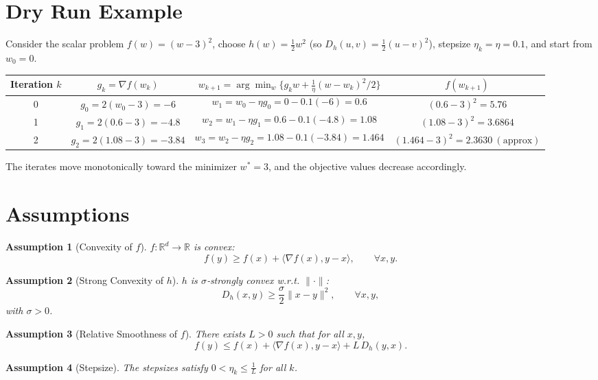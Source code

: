 \documentclass{article}
\newtheorem{assumption}{Assumption}
\newcommand{\inner}[2]{\langle #1,#2\rangle}
\newcommand{\grad}{\nabla}
\newcommand{\Breg}[2]{D_{h}(#1,#2)}
\begin{document}
\section*{Dry Run Example}
Consider the scalar problem $f(w)=(w-3)^{2}$, choose $h(w)=\tfrac12 w^{2}$ (so $\Breg{u}{v}=\tfrac12 (u-v)^{2}$), stepsize $\eta_k=\eta=0.1$, and start from $w_{0}=0$.

\begin{center}
\begin{tabular}{c|c|c|c}
Iteration $k$ & $g_k=\grad f(w_k)$ & $w_{k+1}= \arg\min_w\{g_k w+\frac{1}{\eta}(w-w_k)^2/2\}$ & $f(w_{k+1})$\\ \hline
0 & $g_0=2(w_0-3)=-6$ &
\[
w_{1}=w_0-\eta g_0=0-0.1(-6)=0.6
\] &
$(0.6-3)^{2}=5.76$\\ \hline
1 & $g_1=2(0.6-3)=-4.8$ &
\[
w_{2}=w_{1}-\eta g_1=0.6-0.1(-4.8)=1.08
\] &
$(1.08-3)^{2}=3.6864$\\ \hline
2 & $g_2=2(1.08-3)=-3.84$ &
\[
w_{3}=w_{2}-\eta g_2=1.08-0.1(-3.84)=1.464
\] &
$(1.464-3)^{2}=2.3630\ (\text{approx})$
\end{tabular}
\end{center}
The iterates move monotonically toward the minimizer $w^{*}=3$, and the objective values decrease accordingly.

\newpage
\section*{Assumptions}
\begin{assumption}[Convexity of $f$]
\label{ass:convex}
$f:\mathbb{R}^{d}\rightarrow\mathbb{R}$ is convex:
\[
    f(y)\ge f(x)+\inner{\grad f(x)}{y-x},\qquad\forall x,y.
\]
\end{assumption}
\begin{assumption}[Strong Convexity of $h$]
\label{ass:h_sc}
$h$ is $\sigma$‑strongly convex w.r.t. $\|\cdot\|$:
\[
    \Breg{x}{y}\ge\frac{\sigma}{2}\|x-y\|^{2},\qquad\forall x,y,
\]
with $\sigma>0$.
\end{assumption}
\begin{assumption}[Relative Smoothness of $f$]
\label{ass:rel_smooth}
There exists $L>0$ such that for all $x,y$,
\[
    f(y)\le f(x)+\inner{\grad f(x)}{y-x}+L\,\Breg{y}{x}.
\]
\end{assumption}
\begin{assumption}[Stepsize]
\label{ass:stepsize}
The stepsizes satisfy $0<\eta_{k}\le\frac{1}{L}$ for all $k$.
\end{assumption}
\end{document}
